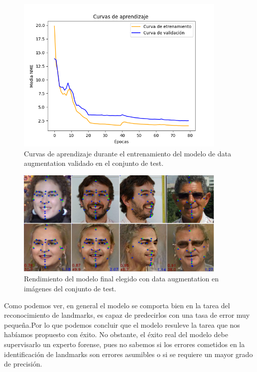         \begin{figure}[!h]
            \centering
            \includegraphics[width=0.9\textwidth]{img/curvas_FinalModel.png}
            \caption{Curvas de aprendizaje durante el entrenamiento del modelo de data augmentation validado en el conjunto de test.}
            \label{fig:curvas_FinalModel}
        \end{figure}

        \begin{figure}[!h]
            \centering
            \includegraphics[width=0.9\textwidth]{img/image_finalmodel.png}
            \caption{Rendimiento del modelo final elegido con data augmentation en imágenes del conjunto de test.}
            \label{fig:Ejemplo_finalmodel}
        \end{figure}

        \medskip

        \noindent Como podemos ver, en general el modelo se comporta bien en la tarea del reconocimiento de landmarks, es capaz de predecirlos con una tasa de error muy pequeña.Por lo que podemos concluir que el modelo resuleve la tarea que nos habíamos propuesto con éxito. No obstante, el éxito real del modelo debe supervisarlo un experto forense, pues no sabemos si los errores cometidos en la identificación de landmarks son errores asumibles o si se requiere un mayor grado de precisión.

